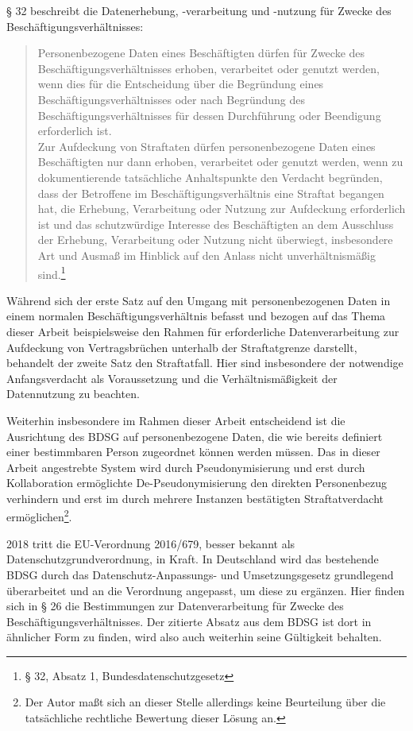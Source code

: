 § 32 beschreibt die Datenerhebung, -verarbeitung und -nutzung für Zwecke des Beschäftigungsverhältnisses:
\begin{quotation}
Personenbezogene Daten eines Beschäftigten dürfen für Zwecke des Beschäftigungsverhältnisses erhoben, verarbeitet oder genutzt werden, wenn dies für die Entscheidung über die Begründung eines Beschäftigungsverhältnisses oder nach Begründung des Beschäftigungsverhältnisses für dessen Durchführung oder Beendigung erforderlich ist.\\
Zur Aufdeckung von Straftaten dürfen personenbezogene Daten eines Beschäftigten nur dann erhoben, verarbeitet oder genutzt werden, wenn zu dokumentierende tatsächliche Anhaltspunkte den Verdacht begründen, dass der Betroffene im Beschäftigungsverhältnis eine Straftat begangen hat, die Erhebung, Verarbeitung oder Nutzung zur Aufdeckung erforderlich ist und das schutzwürdige Interesse des Beschäftigten an dem Ausschluss der Erhebung, Verarbeitung oder Nutzung nicht überwiegt, insbesondere Art und Ausmaß im Hinblick auf den Anlass nicht unverhältnismäßig sind.\footnote{
  § 32, Absatz 1, Bundesdatenschutzgesetz
}
\end{quotation}

Während sich der erste Satz auf den Umgang mit personenbezogenen Daten in einem normalen Beschäftigungsverhältnis befasst und bezogen auf das Thema dieser Arbeit beispielsweise den Rahmen für erforderliche Datenverarbeitung zur Aufdeckung von Vertragsbrüchen unterhalb der Straftatgrenze darstellt, behandelt der zweite Satz den Straftatfall. Hier sind insbesondere der notwendige Anfangsverdacht als Voraussetzung und die Verhältnismäßigkeit der Datennutzung zu beachten. 

Weiterhin insbesondere im Rahmen dieser Arbeit entscheidend ist die Ausrichtung des BDSG auf personenbezogene Daten, die wie bereits definiert einer bestimmbaren Person zugeordnet können werden müssen. Das in dieser Arbeit angestrebte System wird durch Pseudonymisierung und erst durch Kollaboration ermöglichte De-Pseudonymisierung den direkten Personenbezug verhindern und erst im durch mehrere Instanzen bestätigten Straftatverdacht ermöglichen\footnote{
  Der Autor maßt sich an dieser Stelle allerdings keine Beurteilung über die tatsächliche rechtliche Bewertung dieser Lösung an.
}.

2018 tritt die EU-Verordnung 2016/679, besser bekannt als Datenschutzgrundverordnung, in Kraft. In Deutschland wird das bestehende BDSG durch das Datenschutz-Anpassungs- und Umsetzungsgesetz grundlegend überarbeitet und an die Verordnung angepasst, um diese zu ergänzen. Hier finden sich in § 26 die Bestimmungen zur Datenverarbeitung für Zwecke des Beschäftigungsverhältnisses. Der zitierte Absatz aus dem BDSG ist dort in ähnlicher Form zu finden, wird also auch weiterhin seine Gültigkeit behalten. 







